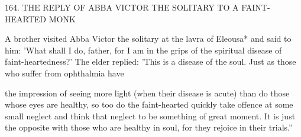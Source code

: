 164. THE REPLY OF ABBA VICTOR THE SOLITARY
TO A FAINT-HEARTED MONK

A brother visited Abba Victor the solitary at the lavra of Eleousa*
and said to him: 'What shall I do, father, for I am in the grips of
the spiritual disease of faint-heartedness?' The elder replied: 'This is
a disease of the soul. Just as those who suffer from ophthalmia have

the impression of seeing more light (when their disease is acute) than
do those whose eyes are healthy, so too do the faint-hearted quickly
take offence at some small neglect and think that neglect to be
something of great moment. It is just the opposite with those who
are healthy in soul, for they rejoice in their trials.”

